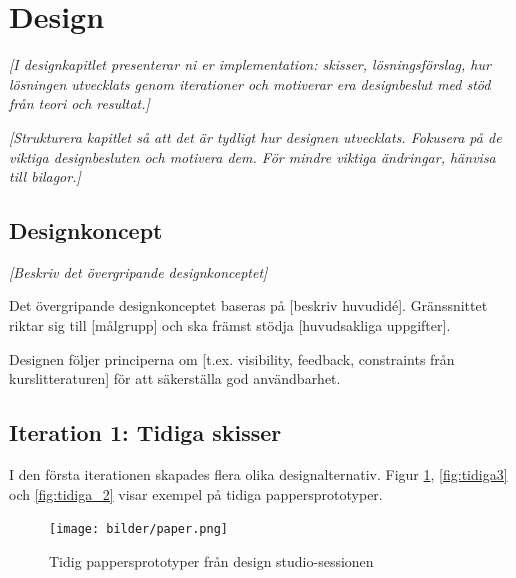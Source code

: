 \section{Design}

\textit{[I designkapitlet presenterar ni er implementation: skisser, lösningsförslag, hur lösningen utvecklats genom iterationer och motiverar era designbeslut med stöd från teori och resultat.]}

\textit{[Strukturera kapitlet så att det är tydligt hur designen utvecklats. Fokusera på de viktiga designbesluten och motivera dem. För mindre viktiga ändringar, hänvisa till bilagor.]}


\subsection{Designkoncept}

\textit{[Beskriv det övergripande designkonceptet]}

Det övergripande designkonceptet baseras på [beskriv huvudidé]. Gränssnittet riktar sig till [målgrupp] och ska främst stödja [huvudsakliga uppgifter].

Designen följer principerna om [t.ex. visibility, feedback, constraints från kurslitteraturen] för att säkerställa god användbarhet.


\subsection{Iteration 1: Tidiga skisser}

I den första iterationen skapades flera olika designalternativ. Figur \ref{fig:tidiga_skisser}, \ref{fig:tidiga3} och \ref{fig:tidiga_2} visar exempel på tidiga pappersprototyper.

\begin{figure}[H]
    \centering
    \texttt{[image: bilder/paper.png]}
    \caption{Tidig pappersprototyper från design studio-sessionen}
    \label{fig:tidiga_skisser}
\end{figure}

